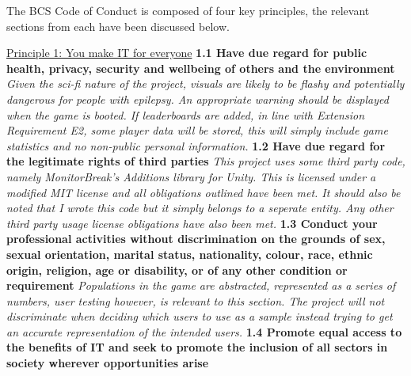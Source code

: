 \documentclass{report}
\begin{document}
The BCS Code of Conduct is composed of four key principles, the relevant sections from each have been discussed below.
\newline
\newline
\begin{raggedright}
{\Large \underline{Principle 1: You make IT for everyone}}
\newline
\newline
\textbf{1.1 Have due regard for public health, privacy, security and wellbeing of others and the environment}
\newline
\newline
\textit{Given the sci-fi nature of the project, visuals are likely to be flashy and potentially dangerous for people with epilepsy. An appropriate warning should be displayed when the game is booted. If leaderboards are added, in line with Extension Requirement E2, some player data will be stored, this will simply include game statistics and no non-public personal information.}
\newline
\newline
\textbf{1.2 Have due regard for the legitimate rights of third parties}
\newline
\newline
\textit{This project uses some third party code, namely MonitorBreak's Additions library for Unity. This is licensed under a modified MIT license\cite{additionsLicense} and all obligations outlined have been met. It should also be noted that I wrote this code but it simply belongs to a seperate entity.
Any other third party usage license obligations have also been met.}
\newline
\newline
\textbf{1.3 Conduct your professional activities without discrimination on the grounds of sex, sexual orientation, marital status, nationality, colour, race, ethnic origin, religion, age or disability, or of any other condition or requirement}
\newline
\newline
\textit{Populations in the game are abstracted, represented as a series of numbers, user testing however, is relevant to this section. The project will not discriminate when deciding which users to use as a sample instead trying to get an accurate representation of the intended users.}
\newline
\newline
\textbf{1.4 Promote equal access to the benefits of IT and seek to promote the inclusion of all sectors in society wherever opportunities arise}

\end{raggedright}
\end{document}
